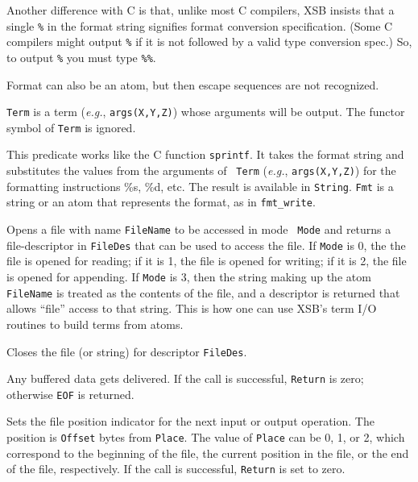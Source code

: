 \begin{description}
    Another difference with C is that, unlike most C compilers, XSB insists
    that a single {\tt \%} in the format string signifies format conversion
    specification. (Some C compilers might output {\tt \%} if it is not
    followed by a valid type conversion spec.) So, to output {\tt \%}
    you must type {\tt \%\%}.
    
    Format can also be an atom, but then escape sequences are not
    recognized.

    {\tt Term} is a term ({\it e.g.}, {\tt args(X,Y,Z)}) whose arguments
    will be output. 
    The functor symbol of {\tt Term} is ignored.

    This predicate works like the C function {\tt sprintf}. It takes the
    format string and substitutes the values from the arguments of {\tt
      Term} ({\it e.g.}, {\tt args(X,Y,Z)}) for the formatting instructions
    \%s, \%d, etc. The result is available in {\tt String}. {\tt Fmt} is a
    string or an atom that represents the format, as in
    {\tt fmt\_write}.

    Opens a file with name {\tt FileName} to be accessed in mode {\tt
    Mode} and returns a file-descriptor in {\tt FileDes} that can be
    used to access the file.  If {\tt Mode} is 0, the the file is
    opened for reading; if it is 1, the file is opened for writing; if
    it is 2, the file is opened for appending.  If {\tt Mode} is 3,
    then the string making up the atom {\tt FileName} is treated as
    the contents of the file, and a descriptor is returned that allows
    ``file'' access to that string.  This is how one can use
    XSB's term I/O routines to build terms from atoms.

    Closes the file (or string) for descriptor {\tt FileDes}.

    Any buffered data gets delivered. If the call is successful, {\tt Return}
    is zero; otherwise {\tt EOF} is returned.

    Sets the file position indicator for the next input or output
    operation. The position is {\tt Offset} bytes from {\tt Place}.
    The value of {\tt Place} can be 0, 1, or 2, which correspond to
    the beginning of the file, the current position in the file, or
    the end of the file, respectively. If the call is successful,
    {\tt Return} is set to zero.


\end{description}
